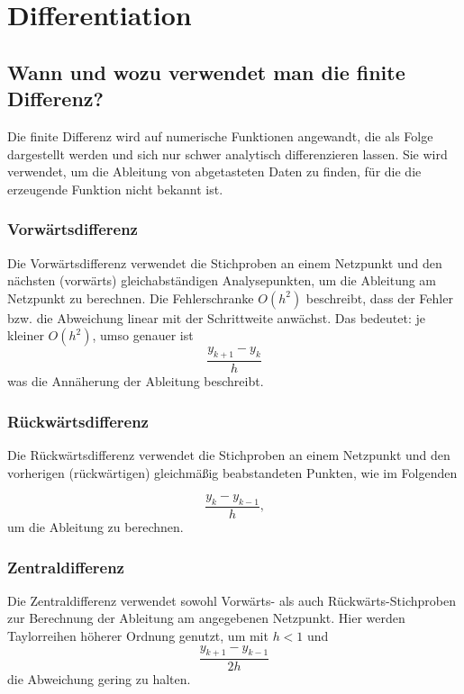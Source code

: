 \chapter{Differentiation}


\section{Wann und wozu verwendet man die finite Differenz?}

Die finite Differenz wird auf numerische Funktionen angewandt, die als Folge dargestellt werden und sich nur schwer analytisch differenzieren lassen. Sie wird verwendet, um die Ableitung von abgetasteten Daten zu finden, für die die erzeugende Funktion nicht bekannt ist.

\subsection{Vorwärtsdifferenz}

Die Vorwärtsdifferenz verwendet die Stichproben an einem Netzpunkt und den nächsten (vorwärts) gleichabständigen Analysepunkten, um die Ableitung am Netzpunkt zu berechnen. Die Fehlerschranke $O(h^2)$ beschreibt, dass der Fehler bzw. die Abweichung linear mit der Schrittweite anwächst. Das bedeutet: je kleiner $O(h^2)$, umso genauer ist 
\[ \frac{y_{k+1} - y_k}{h}\]
was die Annäherung der Ableitung beschreibt\textsc{\cite[S. 273]{Differentiationsformen}}.


\subsection{Rückwärtsdifferenz}

Die Rückwärtsdifferenz verwendet die Stichproben an einem Netzpunkt und den vorherigen (rückwärtigen) gleichmäßig beabstandeten Punkten, wie im Folgenden 

\[\frac{y_k - y_{k-1}}{h} \text{,}\]um die Ableitung zu berechnen\textsc{\cite[S. 273]{Differentiationsformen}}.

\subsection{Zentraldifferenz}
\label{sec:Zentraldifferenz}

Die Zentraldifferenz verwendet sowohl Vorwärts- als auch Rückwärts-Stichproben zur Berechnung der Ableitung am angegebenen Netzpunkt. Hier werden Taylorreihen höherer Ordnung genutzt, um mit $h < 1$ und 
\[
\frac{y_{k+1} - y_{k-1}}{2h}
\]
die Abweichung gering zu halten\textsc{\cite[S. 273]{Differentiationsformen}}.

